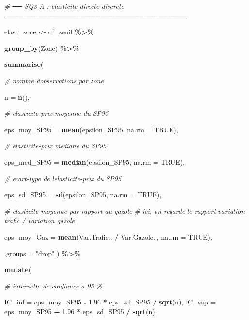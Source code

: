 \documentclass[
]{article}
\newenvironment{Shaded}{\begin{snugshade}}{\end{snugshade}}
\newcommand{\AttributeTok}[1]{\textcolor[rgb]{0.13,0.29,0.53}{#1}}
\newcommand{\CommentTok}[1]{\textcolor[rgb]{0.56,0.35,0.01}{\textit{#1}}}
\newcommand{\ConstantTok}[1]{\textcolor[rgb]{0.56,0.35,0.01}{#1}}
\newcommand{\FloatTok}[1]{\textcolor[rgb]{0.00,0.00,0.81}{#1}}
\newcommand{\FunctionTok}[1]{\textcolor[rgb]{0.13,0.29,0.53}{\textbf{#1}}}
\newcommand{\NormalTok}[1]{#1}
\newcommand{\OtherTok}[1]{\textcolor[rgb]{0.56,0.35,0.01}{#1}}
\newcommand{\SpecialCharTok}[1]{\textcolor[rgb]{0.81,0.36,0.00}{\textbf{#1}}}
\newcommand{\StringTok}[1]{\textcolor[rgb]{0.31,0.60,0.02}{#1}}
\begin{document}
\begin{Shaded}
\begin{Highlighting}[]
\CommentTok{\# ── SQ3{-}A : elasticite directe discrete ──────────────────────────────────────}

\NormalTok{elast\_zone }\OtherTok{\textless{}{-}}\NormalTok{ df\_seuil }\SpecialCharTok{\%\textgreater{}\%}

  \FunctionTok{group\_by}\NormalTok{(Zone) }\SpecialCharTok{\%\textgreater{}\%}

  \FunctionTok{summarise}\NormalTok{(}

    \CommentTok{\# nombre d\textquotesingle{}observations par zone}

    \AttributeTok{n =} \FunctionTok{n}\NormalTok{(),}

    \CommentTok{\# elasticite{-}prix moyenne du SP95}

    \AttributeTok{eps\_moy\_SP95 =} \FunctionTok{mean}\NormalTok{(epsilon\_SP95, }\AttributeTok{na.rm =} \ConstantTok{TRUE}\NormalTok{),}

    \CommentTok{\# elasticite{-}prix mediane du SP95}

    \AttributeTok{eps\_med\_SP95 =} \FunctionTok{median}\NormalTok{(epsilon\_SP95, }\AttributeTok{na.rm =} \ConstantTok{TRUE}\NormalTok{),}

    \CommentTok{\# ecart{-}type de l\textquotesingle{}elasticite{-}prix du SP95}

    \AttributeTok{eps\_sd\_SP95 =} \FunctionTok{sd}\NormalTok{(epsilon\_SP95, }\AttributeTok{na.rm =} \ConstantTok{TRUE}\NormalTok{),}

    \CommentTok{\# elasticite moyenne par rapport au gazole}
    \CommentTok{\# ici, on regarde le rapport variation trafic / variation gazole}

    \AttributeTok{eps\_moy\_Gaz =} \FunctionTok{mean}\NormalTok{(Var.Trafic.. }\SpecialCharTok{/}\NormalTok{ Var.Gazole.., }\AttributeTok{na.rm =} \ConstantTok{TRUE}\NormalTok{),}

    \AttributeTok{.groups =} \StringTok{"drop"}
\NormalTok{  ) }\SpecialCharTok{\%\textgreater{}\%}

  \FunctionTok{mutate}\NormalTok{(}

    \CommentTok{\# intervalle de confiance a 95 \%}

    \AttributeTok{IC\_inf =}\NormalTok{ eps\_moy\_SP95 }\SpecialCharTok{{-}} \FloatTok{1.96} \SpecialCharTok{*}\NormalTok{ eps\_sd\_SP95 }\SpecialCharTok{/} \FunctionTok{sqrt}\NormalTok{(n),}
    \AttributeTok{IC\_sup =}\NormalTok{ eps\_moy\_SP95 }\SpecialCharTok{+} \FloatTok{1.96} \SpecialCharTok{*}\NormalTok{ eps\_sd\_SP95 }\SpecialCharTok{/} \FunctionTok{sqrt}\NormalTok{(n),}


\end{Highlighting}
\end{Shaded}
\end{document}
